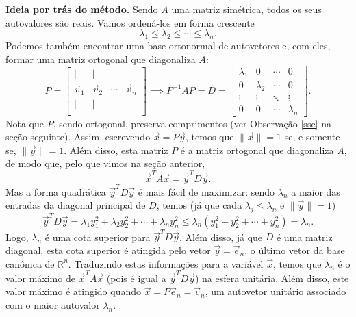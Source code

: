 \documentclass[../livro.tex]{subfiles}
\begin{document}
\noindent \textbf{Ideia por trás do método.} Sendo $A$ uma matriz simétrica, todos os seus autovalores são reais. Vamos ordená-los em forma crescente
\begin{equation}
\lambda_1 \le \lambda_2 \le \cdots \le \lambda_n.
\end{equation} Podemos também encontrar uma base ortonormal de autovetores e, com eles, formar uma matriz ortogonal que diagonaliza $A$:
\begin{equation}
P =  
\begin{bmatrix}
| & | &  & | \\
\vec{v}_1 & \vec{v}_2 & \cdots & \vec{v}_n \\
| & | &  & | \\
\end{bmatrix} \implies
P^{-1} A P = D = 
\begin{bmatrix}
\lambda_1 & 0  & \cdots & 0 \\
0 & \lambda_2  & \cdots & 0 \\
\vdots & \vdots & \ddots & \vdots \\
0 & 0 & \cdots & \lambda_n
\end{bmatrix}.
\end{equation} Nota que $P$, sendo ortogonal, preserva comprimentos (ver Observação \ref{sse} na seção seguinte). Assim, escrevendo $\vec{x} = P \vec{y}$, temos que $\|\vec{x}\| = 1$ se, e somente se, $\|\vec{y}\| = 1$. Além disso, esta matriz $P$ é a matriz ortogonal que diagonaliza $A$, de modo que, pelo que vimos na seção anterior,
\begin{equation}
\vec{x}^T A \vec{x} = \vec{y}^T D \vec{y}.
\end{equation} Mas a forma quadrática $\vec{y}^T D \vec{y}$ é mais fácil de maximizar: sendo $\lambda_n$ a maior das entradas da diagonal principal de $D$, temos (já que cada $\lambda_j \le \lambda_n$ e $\|\vec{y}\| = 1$)
\begin{equation}
\vec{y}^T D \vec{y} = \lambda_1 y_1^2 + \lambda_2 y_2^2 + \cdots + \lambda_n y_n^2 \le  \lambda_n (y_1^2 +y_2^2 + \cdots + y_n^2) = \lambda_n.
\end{equation} Logo, $\lambda_n$ é uma cota superior para $\vec{y}^T D \vec{y}$. Além disso, já que $D$ é uma matriz diagonal, esta cota superior é atingida pelo vetor $\vec{y} = \vec{e}_n$, o último vetor da base canônica de $\mathbb{R}^n$. Traduzindo estas informações para a variável $\vec{x}$, temos que $\lambda_n$ é o valor máximo de $\vec{x}^T A \vec{x}$ (pois é igual a $\vec{y}^T D \vec{y}$) na esfera unitária. Além disso, este valor máximo é atingido quando $\vec{x} = P \vec{e}_n = \vec{v}_n$, um autovetor unitário associado com o maior autovalor $\lambda_n$.
\end{document}
